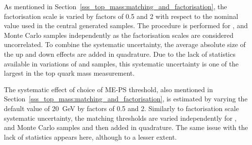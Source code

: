 \begin{description}[wide=\parindent]

\item [Factorisation scale.]
As mentioned in Section~\ref{sss_top_mass:matching_and_factorisation}, the factorisation scale is varied by factors of
0.5 and 2 with respect to the nominal value used in the central generated samples. The procedure is performed for
\ttjets, \WpJets and \ZpJets Monte Carlo samples independently as the factorisation scales are considered uncorrelated.
To combine the systematic uncertainty, the average absolute size of the up and down effects are added in quadrature. Due
to the lack of statistics available in variations of \WpJets and \ZpJets samples, this systematic uncertainty is one of
the largest in the top quark mass measurement.


\item [ME-PS matching threshold.]
The systematic effect of choice of ME-PS threshold, also mentioned in
Section~\ref{sss_top_mass:matching_and_factorisation}, is estimated by varying the default value of \SI{20}{\GeV} by
factors of 0.5 and 2. Similarly to factorisation scale systematic uncertainty, the matching thresholds are varied
independently for \ttjets, \WpJets and \ZpJets Monte Carlo samples and then added in quadrature. The same issue with the
lack of statistics appears here, although to a lesser extent.


\end{description}
